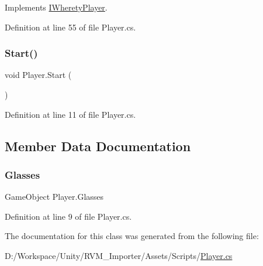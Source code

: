 Implements \mbox{\hyperlink{interface_i_wherety_player_afd5f6bbda4034e3c00502d0ac26474c1}{I\+Wherety\+Player}}.



Definition at line 55 of file Player.\+cs.

\mbox{\label{class_player_a1a09a3ded16ac1646f6bdd4f25fe0ddd}} 
\subsubsection{\texorpdfstring{Start()}{Start()}}
{\footnotesize\ttfamily void Player.\+Start (\begin{DoxyParamCaption}{ }\end{DoxyParamCaption})}



Definition at line 11 of file Player.\+cs.



\subsection{Member Data Documentation}
\mbox{\label{class_player_aa5b58a5ebfa1552e054794a7133ade51}} 
\subsubsection{\texorpdfstring{Glasses}{Glasses}}
{\footnotesize\ttfamily Game\+Object Player.\+Glasses}



Definition at line 9 of file Player.\+cs.



The documentation for this class was generated from the following file\+:\begin{DoxyCompactItemize}
\item 
D\+:/\+Workspace/\+Unity/\+R\+V\+M\+\_\+\+Importer/\+Assets/\+Scripts/\mbox{\hyperlink{_player_8cs}{Player.\+cs}}\end{DoxyCompactItemize}
